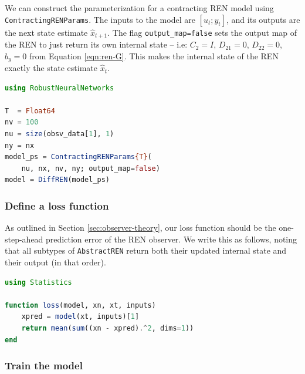 We can construct the parameterization for a contracting REN model using \verb|ContractingRENParams|. The inputs to the model are $[u_t;y_t]$, and its outputs are the next state estimate $\hat{x}_{t+1}$. The flag \verb|output_map=false| sets the output map of the REN to just return its own internal state -- i.e: $C_2 = I$, $D_{21} = 0$, $D_{22} = 0$, $b_y = 0$ from Equation \ref{eqn:ren-G}. This makes the internal state of the REN exactly the state estimate $\hat{x}_t$.

\begin{lstlisting}[language = Julia]
using RobustNeuralNetworks

T  = Float64
nv = 100
nu = size(obsv_data[1], 1)
ny = nx
model_ps = ContractingRENParams{T}(
    nu, nx, nv, ny; output_map=false)
model = DiffREN(model_ps)
\end{lstlisting}

\subsubsection{Define a loss function} \label{sec:observer-loss}

As outlined in Section \ref{sec:observer-theory}, our loss function should be the one-step-ahead prediction error of the REN observer. We write this as follows, noting that all subtypes of \verb|AbstractREN| return both their updated internal state and their output (in that order).
\begin{lstlisting}[language = Julia]
using Statistics

function loss(model, xn, xt, inputs)
    xpred = model(xt, inputs)[1]
    return mean(sum((xn - xpred).^2, dims=1))
end
\end{lstlisting}

\subsubsection{Train the model} \label{sec:observer-train}

